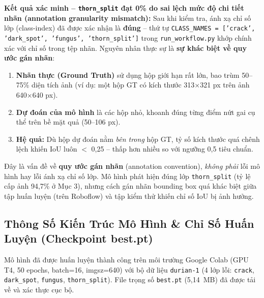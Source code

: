 \documentclass[12pt, a4paper]{article}
\begin{document}
\begin{tcolorbox}[notebox]
\textbf{Kết quả xác minh -- \texttt{thorn\_split} đạt 0\% do sai lệch mức độ chi tiết nhãn (annotation granularity mismatch):} Sau khi kiểm tra, ánh xạ chỉ số lớp (class-index) đã được xác nhận là \textbf{đúng} -- thứ tự \texttt{CLASS\_NAMES = ['crack', 'dark\_spot', 'fungus', 'thorn\_split']} trong \texttt{run\_workflow.py} khớp chính xác với chỉ số trong tệp nhãn. Nguyên nhân thực sự là \textbf{sự khác biệt về quy ước gán nhãn}:
\begin{enumerate}[leftmargin=1.5em]
  \item \textbf{Nhãn thực (Ground Truth)} sử dụng hộp giới hạn rất lớn, bao trùm 50--75\% diện tích ảnh (ví dụ: một hộp GT có kích thước 313$\times$321 px trên ảnh 640$\times$640 px).
  \item \textbf{Dự đoán của mô hình} là các hộp nhỏ, khoanh đúng từng điểm nứt gai cụ thể trên bề mặt quả (50--106 px).
  \item \textbf{Hệ quả:} Dù hộp dự đoán nằm \textit{bên trong} hộp GT, tỷ số kích thước quá chênh lệch khiến IoU luôn $<$ 0,25 -- thấp hơn nhiều so với ngưỡng 0,5 tiêu chuẩn.
\end{enumerate}
Đây là vấn đề về \textbf{quy ước gán nhãn} (annotation convention), \textit{không phải} lỗi mô hình hay lỗi ánh xạ chỉ số lớp. Mô hình phát hiện đúng lớp \texttt{thorn\_split} (tỷ lệ cấp ảnh 94,7\% ở Mục 3), nhưng cách gán nhãn bounding box quá khác biệt giữa tập huấn luyện (trên Roboflow) và tập kiểm thử khiến chỉ số IoU bị ảnh hưởng.
\end{tcolorbox}

\subsection{Thông Số Kiến Trúc Mô Hình \& Chỉ Số Huấn Luyện (Checkpoint best.pt)}

Mô hình đã được huấn luyện thành công trên môi trường Google Colab (GPU T4, 50 epochs, batch=16, imgsz=640) với bộ dữ liệu \texttt{durian-1} (4 lớp lỗi: \texttt{crack}, \texttt{dark\_spot}, \texttt{fungus}, \texttt{thorn\_split}). File trọng số \texttt{best.pt} (5,14~MB) đã được tải về và xác thực cục bộ.
\end{document}
